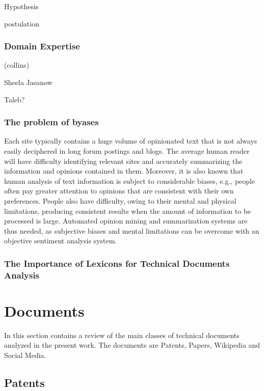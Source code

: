 \documentclass[]{book}
\begin{document}
Hypothesis

postulation

\subsection{Domain Expertise}\label{domain-expertise}

(collins)

Sheela Jasanow

Taleb?

\subsection{The problem of byases}\label{sotadocumentsunderstandbyas}

Each site typically contains a huge volume of opinionated text that is
not always easily deciphered in long forum postings and blogs. The
average human reader will have difficulty identifying relevant sites and
accurately summarizing the information and opinions contained in them.
Moreover, it is also known that human analysis of text information is
subject to considerable biases, e.g., people often pay greater attention
to opinions that are consistent with their own preferences. People also
have difficulty, owing to their mental and physical limitations,
producing consistent results when the amount of information to be
processed is large. Automated opinion mining and summarization systems
are thus needed, as subjective biases and mental limitations can be
overcome with an objective sentiment analysis system.

\subsection{The Importance of Lexicons for Technical Documents
Analysis}\label{sotadocumentsunderstandlexicons}

\chapter{Documents}\label{sotadocuments}

In this section contains a review of the main classes of technical
documents analyzed in the present work. The documents are Patents,
Papers, Wikipedia and Social Media.

\section{Patents}\label{sotadocumentspatents}
\end{document}
